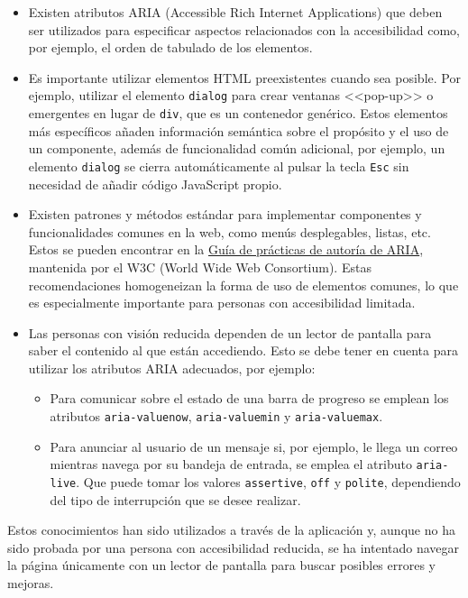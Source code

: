 \begin{itemize}
    \item Existen atributos ARIA (Accessible Rich Internet Applications) que
    deben ser utilizados para especificar aspectos relacionados con la
    accesibilidad como, por ejemplo, el orden de tabulado de los elementos.
    \item Es importante utilizar elementos HTML preexistentes cuando sea
    posible. Por ejemplo, utilizar el elemento \texttt{dialog} para crear
    ventanas <<pop-up>> o emergentes en lugar de \texttt{div}, que es un
    contenedor genérico. Estos elementos más específicos añaden información
    semántica sobre el propósito y el uso de un componente, además de
    funcionalidad común adicional, por ejemplo, un elemento \texttt{dialog} se
    cierra automáticamente al pulsar la tecla \texttt{Esc} sin necesidad de
    añadir código JavaScript propio.
    \item Existen patrones y métodos estándar para implementar componentes y
    funcionalidades comunes en la web, como menús desplegables, listas, etc.
    Estos se pueden encontrar en la
    \href{https://www.w3.org/WAI/ARIA/apg/patterns/}{Guía de prácticas de
    autoría de ARIA}, mantenida por el W3C (World Wide Web Consortium). Estas
    recomendaciones homogeneizan la forma de uso de elementos comunes, lo que es
    especialmente importante para personas con accesibilidad limitada.
    \item Las personas con visión reducida dependen de un lector de pantalla
    para saber el contenido al que están accediendo. Esto se debe tener en
    cuenta para utilizar los atributos ARIA adecuados, por ejemplo:
        \begin{itemize}
            \item Para comunicar sobre el estado de una barra de progreso se
            emplean los atributos \texttt{aria-valuenow}, \texttt{aria-valuemin}
            y \texttt{aria-valuemax}.
            \item Para anunciar al usuario de un mensaje si, por ejemplo, le
            llega un correo mientras navega por su bandeja de entrada, se emplea
            el atributo \texttt{aria-live}. Que puede tomar los valores
            \texttt{assertive}, \texttt{off} y \texttt{polite}, dependiendo del
            tipo de interrupción que se desee realizar.
        \end{itemize}
\end{itemize}

Estos conocimientos han sido utilizados a través de la aplicación y, aunque no
ha sido probada por una persona con accesibilidad reducida, se ha intentado
navegar la página únicamente con un lector de pantalla para buscar posibles
errores y mejoras.

